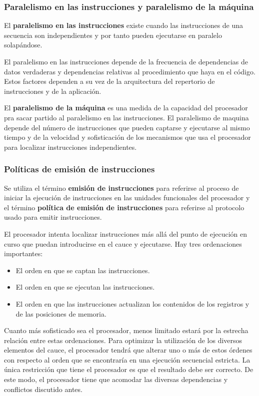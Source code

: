 \subsubsection*{Paralelismo en las instrucciones y paralelismo de la máquina}

El \textbf{paralelismo en las instrucciones} existe cuando las instrucciones de una secuencia son independientes y por tanto pueden ejecutarse en paralelo solapándose.

El paralelismo en las instrucciones depende de la frecuencia de dependencias de datos verdaderas y dependencias relativas al procedimiento que haya en el código. Estos factores dependen a su vez de la arquitectura del repertorio de instrucciones y de la aplicación.

El \textbf{paralelismo de la máquina} es una medida de la capacidad del procesador pra sacar partido al paralelismo en las instrucciones. El paralelismo de maquina depende del número de instrucciones que pueden captarse y ejecutarse al mismo tiempo y de la velocidad y sofisticación de los mecanismos que usa el procesador para localizar instrucciones independientes.

\subsubsection*{Políticas de emisión de instrucciones}

Se utiliza el término \textbf{emisión de instrucciones} para referirse al proceso de iniciar la ejecución de instrucciones en las unidades funcionales del procesador y el término \textbf{política de emisión de instrucciones} para referirse al protocolo usado para emitir instrucciones. 

El procesador intenta localizar instrucciones más allá del punto de ejecución en curso que puedan introducirse en el cauce y ejecutarse. Hay tres ordenaciones importantes:

\begin{itemize}
  \item El orden en que se captan las instrucciones.
  \item El orden en que se ejecutan las instrucciones.
  \item El orden en que las instrucciones actualizan los contenidos de los registros y de las posiciones de memoria.
\end{itemize}

Cuanto más sofisticado sea el procesador, menos limitado estará por la estrecha relación entre estas ordenaciones. Para optimizar la utilización de los diversos elementos del cauce, el procesador tendrá que alterar uno o más de estos órdenes con respecto al orden que se encontraría en una ejecución secuencial estricta. La única restricción que tiene el procesador es que el resultado debe ser correcto. De este modo, el procesador tiene que acomodar las diversas dependencias y conflictos discutido antes.

